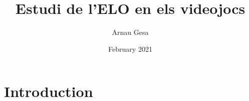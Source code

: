 \documentclass[a4paper]{article}
\title{Estudi de l'ELO en els videojocs}
\author{Arnau Gesa }
\date{February 2021}
\begin{document}
\maketitle
\thispagestyle{empty}

\newpage

\setcounter{page}{1}

\tableofcontents

\newpage
\justify
\section{Introduction}
\end{document}
